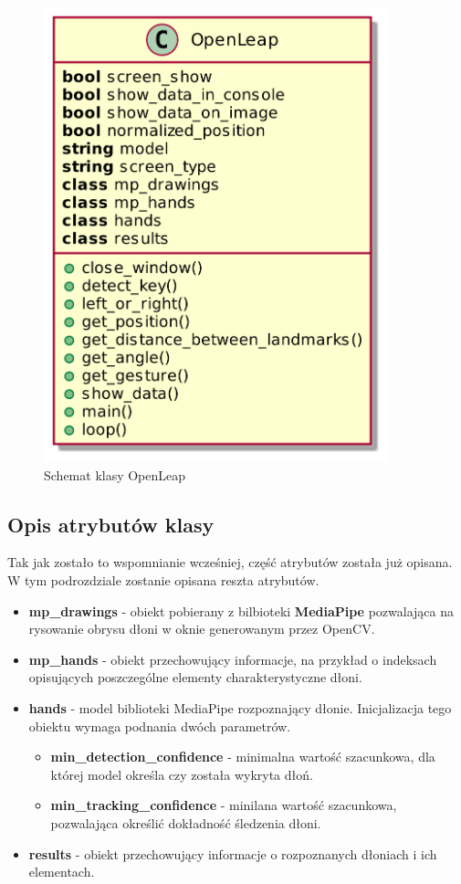\begin{figure}[H]
    \begin{center}
        \includegraphics[width=10cm]{../images/class.png}
        \caption{Schemat klasy OpenLeap}
    \end{center}
\end{figure}

\subsection{Opis atrybutów klasy}

\quad Tak jak zostało to wspomnianie wcześniej, część atrybutów została już opisana. W tym podrozdziale zostanie opisana reszta atrybutów. 

\begin{itemize}
    \item \textbf{mp\_drawings} - obiekt pobierany z bilbioteki \textbf{MediaPipe} pozwalająca na rysowanie obrysu dłoni w oknie generowanym przez OpenCV.
    \item \textbf{mp\_hands} - obiekt przechowujący informacje, na przykład o indeksach opisujących poszczególne elementy charakterystyczne dłoni. 
    \item \textbf{hands} - model biblioteki MediaPipe rozpoznający dłonie. Inicjalizacja tego obiektu wymaga podnania dwóch parametrów. 
    \begin{itemize}
        \item \textbf{min\_detection\_confidence} - minimalna wartość szacunkowa, dla której model określa czy została wykryta dłoń.
        \item \textbf{min\_tracking\_confidence} - minilana wartość szacunkowa, pozwalająca określić dokładność śledzenia dłoni. 
    \end{itemize}
    \item \textbf{results} - obiekt przechowujący informacje o rozpoznanych dłoniach i ich elementach. 
\end{itemize}

